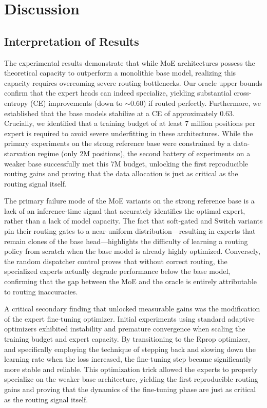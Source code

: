 \chapter{Discussion}

\section{Interpretation of Results}
The experimental results demonstrate that while MoE architectures possess the theoretical capacity to outperform a monolithic base model, realizing this capacity requires overcoming severe routing bottlenecks. Our oracle upper bounds confirm that the expert heads can indeed specialize, yielding substantial cross-entropy (CE) improvements (down to $\sim$0.60) if routed perfectly. Furthermore, we established that the base models stabilize at a CE of approximately 0.63. Crucially, we identified that a training budget of at least 7 million positions per expert is required to avoid severe underfitting in these architectures. While the primary experiments on the strong reference base were constrained by a data-starvation regime (only 2M positions), the second battery of experiments on a weaker base successfully met this 7M budget, unlocking the first reproducible routing gains and proving that the data allocation is just as critical as the routing signal itself.

The primary failure mode of the MoE variants on the strong reference base is a lack of an inference-time signal that accurately identifies the optimal expert, rather than a lack of model capacity. The fact that soft-gated and Switch variants pin their routing gates to a near-uniform distribution---resulting in experts that remain clones of the base head---highlights the difficulty of learning a routing policy from scratch when the base model is already highly optimized. Conversely, the random dispatcher control proves that without correct routing, the specialized experts actually degrade performance below the base model, confirming that the gap between the MoE and the oracle is entirely attributable to routing inaccuracies.

A critical secondary finding that unlocked measurable gains was the modification of the expert fine-tuning optimizer. Initial experiments using standard adaptive optimizers exhibited instability and premature convergence when scaling the training budget and expert capacity. By transitioning to the Rprop optimizer, and specifically employing the technique of stepping back and slowing down the learning rate when the loss increased, the fine-tuning step became significantly more stable and reliable. This optimization trick allowed the experts to properly specialize on the weaker base architecture, yielding the first reproducible routing gains and proving that the dynamics of the fine-tuning phase are just as critical as the routing signal itself.

